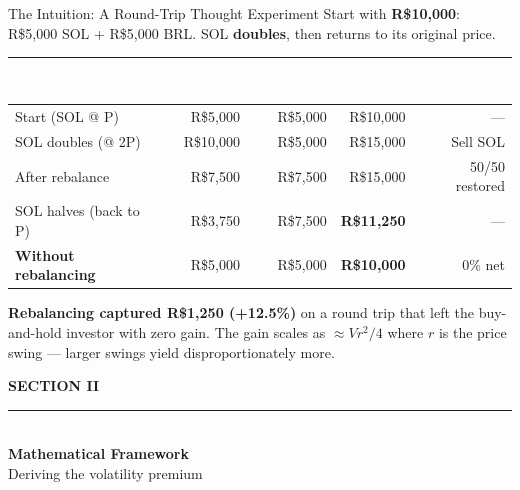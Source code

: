 \documentclass[aspectratio=169,10pt]{beamer}
\begin{document}
\begin{frame}{The Intuition: A Round-Trip Thought Experiment}
\vspace{0.2em}
{\small\color{BodyText}
Start with \textbf{R\$10{,}000}: R\$5{,}000 SOL + R\$5{,}000 BRL.
SOL \textbf{doubles}, then returns to its original price.}

\vspace{0.3em}
\begin{center}
\begin{tabular}{@{\hspace{0.4em}}l r r r r@{\hspace{0.4em}}}
\toprule
\rowcolor{Navy}\textcolor{white}{\textbf{Step}} &
  \textcolor{white}{\textbf{SOL value}} &
  \textcolor{white}{\textbf{BRL value}} &
  \textcolor{white}{\textbf{Total}} &
  \textcolor{white}{\textbf{Action}} \\
\midrule
Start (SOL @ P)         & R\$5{,}000 & R\$5{,}000 & R\$10{,}000 & --- \\
SOL doubles (@ 2P)      & R\$10{,}000 & R\$5{,}000 & R\$15{,}000 & Sell SOL \\
After rebalance         & R\$7{,}500 & R\$7{,}500 & R\$15{,}000 & 50/50 restored \\
SOL halves (back to P)  & R\$3{,}750 & R\$7{,}500 & \textcolor{Success}{\textbf{R\$11{,}250}} & --- \\
\midrule
\textbf{Without rebalancing} & R\$5{,}000 & R\$5{,}000 & \textbf{R\$10{,}000} & 0\% net \\
\bottomrule
\end{tabular}
\end{center}

\vspace{0.3em}
{\small\color{BodyText}
\textbf{Rebalancing captured R\$1{,}250 (+12.5\%)} on a round trip that left the buy-and-hold investor with zero gain.
The gain scales as $\approx Vr^2/4$ where $r$ is the price swing --- larger swings yield disproportionately more.}
\end{frame}

\begin{frame}[plain]
\vspace{2.5cm}
\begin{center}
  {\color{Gold}\small\bfseries SECTION II}\\[0.3cm]
  {\color{Gold}\rule{6cm}{0.6pt}}\\[0.4cm]
  {\color{white}\fontsize{22}{28}\selectfont\bfseries Mathematical Framework}\\[0.35cm]
  {\color{white!60!black}\normalsize Deriving the volatility premium}
\end{center}
\end{frame}
\end{document}

